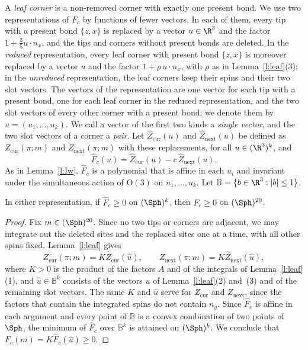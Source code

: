 A \emph{leaf corner} is a non-removed corner with exactly one present bond. We use two representations of $F_c$ by functions of fewer vectors. In each of them, every tip with a present bond $\{z, x\}$ is replaced by a vector $u \in \R^3$ and the factor $1 + \frac35 u \cdot n_x$, and the tips and corners without present bonds are deleted. In the \emph{reduced} representation, every leaf corner with present bond $\{z, x\}$ is moreover replaced by a vector $u$ and the factor $1 + \rho \, u \cdot n_x$, with $\rho$ as in Lemma~\ref{l:leaf}(3); in the \emph{unreduced} representation, the leaf corners keep their spins and their two slot vectors. The vectors of the representation are one vector for each tip with a present bond, one for each leaf corner in the reduced representation, and the two slot vectors of every other corner with a present bond; we denote them by $u = (u_1, \dots, u_k)$. We call a vector of the first two kinds a \emph{single vector}, and the two slot vectors of a corner a \emph{pair}. Let $\hat Z_{\mathrm{cur}}(u)$ and $\hat Z_{\mathrm{next}}(u)$ be defined as $Z_{\mathrm{cur}}(\pi; m)$ and $Z_{\mathrm{next}}(\pi; m)$ with these replacements, for all $u \in (\R^3)^k$, and
\begin{equation}\label{e:hatF}
\hat F_c(u) = \hat Z_{\mathrm{cur}}(u) - c \, \hat Z_{\mathrm{next}}(u) .
\end{equation}
As in Lemma~\ref{l:Iw}, $\hat F_c$ is a polynomial that is affine in each $u_i$ and invariant under the simultaneous action of $\mathrm O(3)$ on $u_1, \dots, u_k$. Let $\mathbb B = \{ b \in \R^3 : |b| \le 1 \}$.

\begin{corollary}\label{c:reduce}
In either representation, if $\hat F_c \ge 0$ on $(\Sph)^k$, then $F_c \ge 0$ on $(\Sph)^{20}$.
\end{corollary}

\begin{proof}
Fix $m \in (\Sph)^{20}$. Since no two tips or corners are adjacent, we may integrate out the deleted sites and the replaced sites one at a time, with all other spins fixed. Lemma~\ref{l:leaf} gives
\begin{equation*}
Z_{\mathrm{cur}}(\pi; m) = K \hat Z_{\mathrm{cur}}(\hat u), \qquad Z_{\mathrm{next}}(\pi; m) = K \hat Z_{\mathrm{next}}(\hat u),
\end{equation*}
where $K > 0$ is the product of the factors $A$ and of the integrals of Lemma~\ref{l:leaf}(1), and $\hat u \in \mathbb B^k$ consists of the vectors $u$ of Lemma~\ref{l:leaf}(2) and~(3) and of the remaining slot vectors. The same $K$ and $\hat u$ serve for $Z_{\mathrm{cur}}$ and $Z_{\mathrm{next}}$, since the factors that contain the integrated spins do not contain $n_y$. Since $\hat F_c$ is affine in each argument and every point of $\mathbb B$ is a convex combination of two points of $\Sph$, the minimum of $\hat F_c$ over $\mathbb B^k$ is attained on $(\Sph)^k$. We conclude that $F_c(m) = K \hat F_c(\hat u) \ge 0$.
\end{proof}

